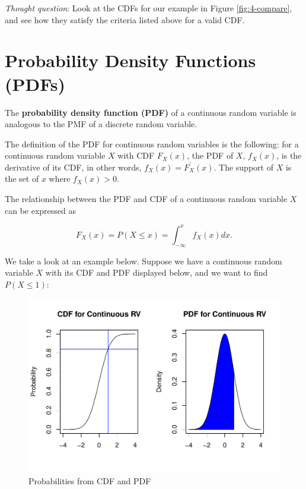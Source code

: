 \documentclass[
]{book}
\begin{document}
\emph{Thought question}: Look at the CDFs for our example in Figure \ref{fig:4-compare}, and see how they satisfy the criteria listed above for a valid CDF.

\section{Probability Density Functions (PDFs)}\label{probability-density-functions-pdfs}

The \textbf{probability density function (PDF)} of a continuous random variable is analogous to the PMF of a discrete random variable.

The definition of the PDF for continuous random variables is the following: for a continuous random variable \(X\) with CDF \(F_X(x)\), the PDF of \(X\), \(f_X(x)\), is the derivative of its CDF, in other words, \(f_X(x) = F_X^{\prime}(x)\). The support of \(X\) is the set of \(x\) where \(f_X(x) >0\).

The relationship between the PDF and CDF of a continuous random variable \(X\) can be expressed as

\begin{equation} 
F_X(x) = P(X \leq x) = \int_{-\infty}^{x} f_X(x) dx.
\label{eq:4-PDFCDF}
\end{equation}

We take a look at an example below. Suppose we have a continuous random variable \(X\) with its CDF and PDF displayed below, and we want to find \(P(X \leq 1)\):

\begin{figure}
\centering
\includegraphics{bookdown-demo_files/figure-latex/4-prob-1.pdf}
\caption{\label{fig:4-prob}Probabilities from CDF and PDF}
\end{figure}
\end{document}
